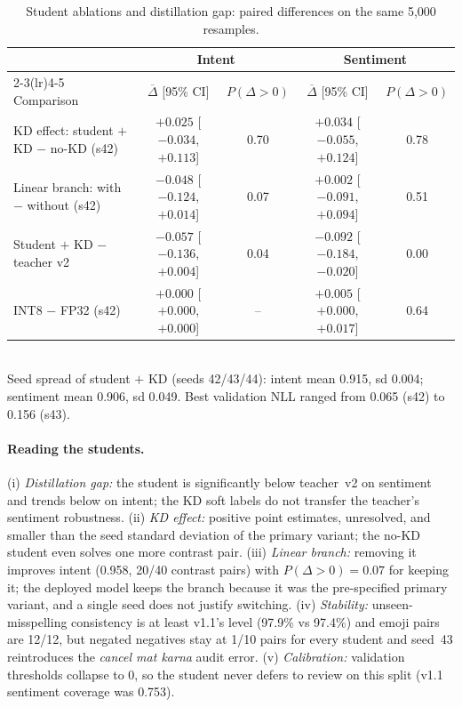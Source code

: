 \documentclass[11pt,a4paper]{article}
\theoremstyle{remark}
\newcommand{\hi}[1]{\textit{#1}}
\begin{document}
\begin{table}[h]
\centering\small
\caption{Student ablations and distillation gap: paired differences on the same 5{,}000 resamples.}
\label{tab:studentpaired}
\begin{tabular}{@{}l cc cc@{}}
\toprule
& \multicolumn{2}{c}{Intent} & \multicolumn{2}{c}{Sentiment} \\
\cmidrule(lr){2-3}\cmidrule(lr){4-5}
Comparison & $\overline\Delta$ [95\% CI] & $P(\Delta>0)$ & $\overline\Delta$ [95\% CI] & $P(\Delta>0)$ \\
\midrule
KD effect: student $+$ KD $-$ no-KD (s42) & $+0.025$ [$-0.034$, $+0.113$] & 0.70 & $+0.034$ [$-0.055$, $+0.124$] & 0.78 \\
Linear branch: with $-$ without (s42) & $-0.048$ [$-0.124$, $+0.014$] & 0.07 & $+0.002$ [$-0.091$, $+0.094$] & 0.51 \\
Student $+$ KD $-$ teacher v2 & $-0.057$ [$-0.136$, $+0.004$] & 0.04 & $\mathbf{-0.092}$ [$-0.184$, $-0.020$] & 0.00 \\
INT8 $-$ FP32 (s42) & $+0.000$ [$+0.000$, $+0.000$] & -- & $+0.005$ [$+0.000$, $+0.017$] & 0.64 \\
\bottomrule
\end{tabular}
\\[2pt]{\footnotesize Seed spread of student $+$ KD (seeds 42/43/44): intent mean 0.915, sd 0.004; sentiment mean 0.906, sd 0.049. Best validation NLL ranged from 0.065 (s42) to 0.156 (s43).}
\end{table}

\paragraph{Reading the students.} (i) \emph{Distillation gap:} the student is significantly below teacher~v2 on sentiment and trends below on intent; the KD soft labels do not transfer the teacher's sentiment robustness. (ii) \emph{KD effect:} positive point estimates, unresolved, and smaller than the seed standard deviation of the primary variant; the no-KD student even solves one more contrast pair. (iii) \emph{Linear branch:} removing it improves intent (0.958, 20/40 contrast pairs) with $P(\Delta>0)=0.07$ for keeping it; the deployed model keeps the branch because it was the pre-specified primary variant, and a single seed does not justify switching. (iv) \emph{Stability:} unseen-misspelling consistency is at least v1.1's level (97.9\% vs 97.4\%) and emoji pairs are 12/12, but negated negatives stay at 1/10 pairs for every student and seed~43 reintroduces the \hi{cancel mat karna} audit error. (v) \emph{Calibration:} validation thresholds collapse to 0, so the student never defers to review on this split (v1.1 sentiment coverage was 0.753).
\end{document}
